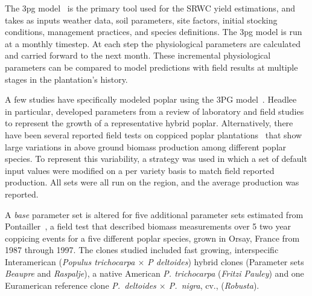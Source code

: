 \documentclass[preprint,12pt]{elsarticle}
\begin{document}
The \acf{3pg} model~\cite{Landsberg1997, landsberg2010physiological,
  Sands2004} is the primary tool used for the \ac{SRWC} yield
estimations, and takes as inputs weather data, soil parameters, site
factors, initial stocking conditions, management practices, and
species definitions.  The \ac{3pg} model is run at a monthly
timestep. At each step the physiological parameters are calculated and
carried forward to the next month.
These incremental physiological parameters
can be compared to model predictions with field results at multiple
stages in the plantation's history.

A few studies have specifically modeled poplar using the 3PG
model~\cite{Amichev2010,Headlee2012,Zalesny2012}. Headlee~\cite{Headlee2012} in
particular, developed parameters from a review of laboratory and field
studies to represent the growth of a representative hybrid poplar.
Alternatively, there have been several reported field tests on
coppiced poplar
plantations~\cite{Proe2002,Proe1999,Pontailler1999,Afas2008a} that
show large variations in above ground biomass production among
different poplar species.  To represent this variability, a strategy
was used in which a set of default input values were modified on a per
variety basis to match field reported production.  All sets were all
run on the region, and the average production was reported.

A \emph{base} parameter set is altered for five additional parameter
sets estimated from
Pontailler~\cite{Pontailler1999,pontailler97-volume-index,Ceulemans1993},
a field test that described biomass measurements over 5 two year
coppicing events for a five different poplar species, grown in Orsay,
France from 1987 through 1997. The clones studied included fast
growing, interspecific Interamerican (\textit{Populus trichocarpa
  $\times$ P deltoides}) hybrid clones (Parameter sets \emph{Beaupre}
and \emph{Raspalje}), a native American \textit{P. trichocarpa}
(\emph{Fritzi Pauley}) and one Euramerican reference clone
\textit{P.~deltoides $\times$ P.~nigra}, cv., (\emph{Robusta}).
\end{document}
